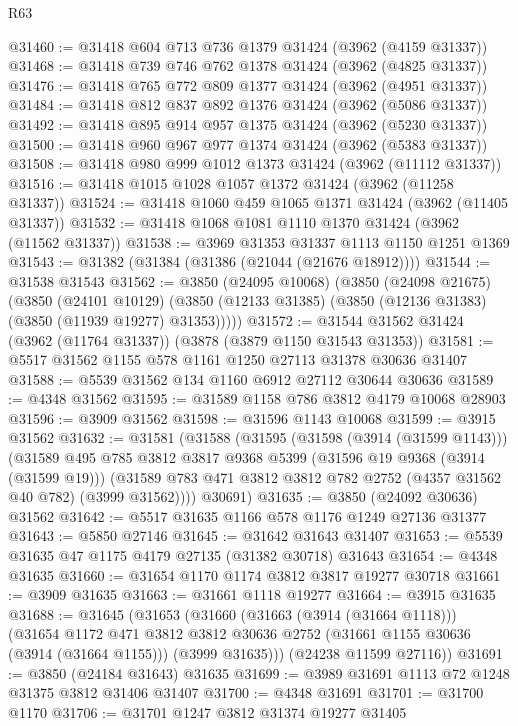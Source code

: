 \begin{lexlean}{R63}
\begin{coremodule}
@31460 := @31418 @604 @713 @736 @1379 @31424 (@3962 (@4159 @31337))
@31468 := @31418 @739 @746 @762 @1378 @31424 (@3962 (@4825 @31337))
@31476 := @31418 @765 @772 @809 @1377 @31424 (@3962 (@4951 @31337))
@31484 := @31418 @812 @837 @892 @1376 @31424 (@3962 (@5086 @31337))
@31492 := @31418 @895 @914 @957 @1375 @31424 (@3962 (@5230 @31337))
@31500 := @31418 @960 @967 @977 @1374 @31424 (@3962 (@5383 @31337))
@31508 := @31418 @980 @999 @1012 @1373 @31424 (@3962 (@11112 @31337))
@31516 := @31418 @1015 @1028 @1057 @1372 @31424 (@3962 (@11258 @31337))
@31524 := @31418 @1060 @459 @1065 @1371 @31424 (@3962 (@11405 @31337))
@31532 := @31418 @1068 @1081 @1110 @1370 @31424 (@3962 (@11562 @31337))
@31538 := @3969 @31353 @31337 @1113 @1150 @1251 @1369
@31543 := @31382 (@31384 (@31386 (@21044 (@21676 @18912))))
@31544 := @31538 @31543
@31562 := @3850
    (@24095 @10068)
    (@3850
      (@24098 @21675)
      (@3850
        (@24101 @10129)
        (@3850 (@12133 @31385) (@3850 (@12136 @31383) (@3850 (@11939 @19277) @31353)))))
@31572 := @31544 @31562 @31424 (@3962 (@11764 @31337)) (@3878 (@3879 @1150 @31543 @31353))
@31581 := @5517 @31562 @1155 @578 @1161 @1250 @27113 @31378 @30636 @31407
@31588 := @5539 @31562 @134 @1160 @6912 @27112 @30644 @30636
@31589 := @4348 @31562
@31595 := @31589 @1158 @786 @3812 @4179 @10068 @28903
@31596 := @3909 @31562
@31598 := @31596 @1143 @10068
@31599 := @3915 @31562
@31632 := @31581
    (@31588
      (@31595
        (@31598 (@3914 (@31599 @1143)))
        (@31589
          @495
          @785
          @3812
          @3817
          @9368
          @5399
          (@31596 @19 @9368 (@3914 (@31599 @19)))
          (@31589 @783 @471 @3812 @3812 @782 @2752 (@4357 @31562 @40 @782) (@3999 @31562))))
      @30691)
@31635 := @3850 (@24092 @30636) @31562
@31642 := @5517 @31635 @1166 @578 @1176 @1249 @27136 @31377
@31643 := @5850 @27146
@31645 := @31642 @31643 @31407
@31653 := @5539 @31635 @47 @1175 @4179 @27135 (@31382 @30718) @31643
@31654 := @4348 @31635
@31660 := @31654 @1170 @1174 @3812 @3817 @19277 @30718
@31661 := @3909 @31635
@31663 := @31661 @1118 @19277
@31664 := @3915 @31635
@31688 := @31645
    (@31653
      (@31660
        (@31663 (@3914 (@31664 @1118)))
        (@31654
          @1172
          @471
          @3812
          @3812
          @30636
          @2752
          (@31661 @1155 @30636 (@3914 (@31664 @1155)))
          (@3999 @31635)))
      (@24238 @11599 @27116))
@31691 := @3850 (@24184 @31643) @31635
@31699 := @3989 @31691 @1113 @72 @1248 @31375 @3812 @31406 @31407
@31700 := @4348 @31691
@31701 := @31700 @1170
@31706 := @31701 @1247 @3812 @31374 @19277 @31405

\end{coremodule}
\end{lexlean}

